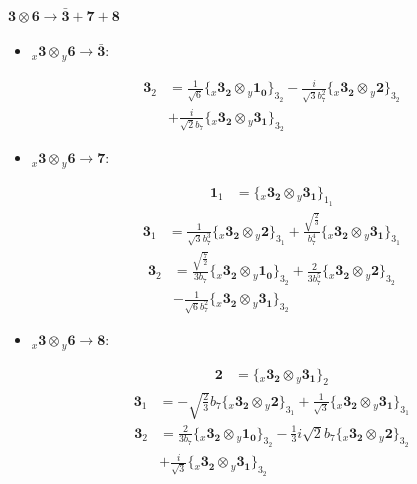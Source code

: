 \documentclass[english]{article}
\newcommand{\cgEqFontsize}{\large}
\newcommand{\rep}[1]{\mathbf{#1}}
\newcommand{\repx}[2]{{}_{#2}\mathbf{#1}}
\newcommand{\tsprod}[2]{\rep{#1}\otimes\rep{#2}}
\newcommand{\tsprodx}[2]{\repx{#1}{x}\otimes\repx{#2}{y}}
\newcommand{\subcgs}[3]{\big\{ \tsprodx{#1}{#2}\big\}^{}_{#3}}
\begin{document}
\paragraph*{\cgEqFontsize $\tsprod{3}{6}\to\rep{\bar{3}}+\rep{7}+\rep{8}$}
\begin{itemize}
\item $\tsprodx{3}{6}\to\rep{\bar{3}}$:
\begin{fleqn}
\begin{align*}
\rep{3}_{2} & = \frac{1}{\sqrt{6}}\subcgs{3_{2}}{1_{0}}{3_{2}}-\frac{i}{\sqrt{3} b_7^2}\subcgs{3_{2}}{2}{3_{2}} \\ 
 & +\frac{i}{\sqrt{2} b_7}\subcgs{3_{2}}{3_{1}}{3_{2}}
\end{align*}
\end{fleqn}
\item $\tsprodx{3}{6}\to\rep{7}$:
\begin{fleqn}
\begin{align*}
\rep{1}_{1} & = \subcgs{3_{2}}{3_{1}}{1_{1}}
\end{align*}
\begin{align*}
\rep{3}_{1} & = \frac{1}{\sqrt{3} b_7^3}\subcgs{3_{2}}{2}{3_{1}}+\frac{\sqrt{\frac{2}{3}}}{b_7^4}\subcgs{3_{2}}{3_{1}}{3_{1}}
\end{align*}
\begin{align*}
\rep{3}_{2} & = \frac{\sqrt{\frac{7}{2}}}{3 b_7}\subcgs{3_{2}}{1_{0}}{3_{2}}+\frac{2}{3 b_7^5}\subcgs{3_{2}}{2}{3_{2}} \\ 
 & -\frac{1}{\sqrt{6} b_7^2}\subcgs{3_{2}}{3_{1}}{3_{2}}
\end{align*}
\end{fleqn}
\item $\tsprodx{3}{6}\to\rep{8}$:
\begin{fleqn}
\begin{align*}
\rep{2} & = \subcgs{3_{2}}{3_{1}}{2}
\end{align*}
\begin{align*}
\rep{3}_{1} & = -\sqrt{\frac{2}{3}} b_7\subcgs{3_{2}}{2}{3_{1}}+\frac{1}{\sqrt{3}}\subcgs{3_{2}}{3_{1}}{3_{1}}
\end{align*}
\begin{align*}
\rep{3}_{2} & = \frac{2}{3 b_7}\subcgs{3_{2}}{1_{0}}{3_{2}}-\frac{1}{3} i \sqrt{2} b_7\subcgs{3_{2}}{2}{3_{2}} \\ 
 & +\frac{i}{\sqrt{3}}\subcgs{3_{2}}{3_{1}}{3_{2}}
\end{align*}
\end{fleqn}
\end{itemize}
\end{document}
